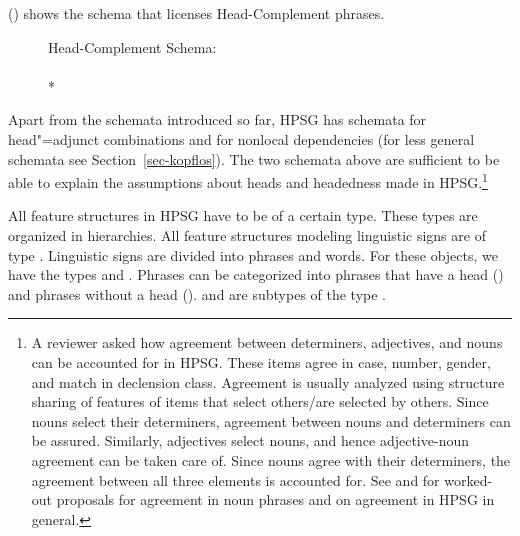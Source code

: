 \documentclass[output=paper
  ,nobabel
  ,draftmode
  ,uniformtopskip %
  ,colorlinks, citecolor=brown
]{langscibook}
\begin{document}
() shows the schema that licenses Head-Complement phrases.
\begin{figure}
\ea
\label{head-complement-phrase}
Head-Complement Schema:\\
 \impl\\*
\z
\vspace{-1.5\baselineskip}
\end{figure}
Apart from the schemata introduced so far, HPSG has schemata for head"=adjunct combinations and for
nonlocal dependencies (for less general schemata see Section~\ref{sec-kopflos}). The two schemata
above are sufficient to be able to explain the assumptions about heads and headedness made in
HPSG.\footnote{%
  A reviewer asked how agreement between determiners, adjectives, and nouns can be accounted for in
  HPSG. These items agree in case, number, gender, and match in declension class. Agreement is usually
  analyzed using structure sharing of features of items that select others/are selected by
  others. Since nouns select their determiners, agreement between nouns and determiners can be
  assured. Similarly, adjectives select nouns, and hence adjective-noun agreement can be taken
  care of. Since nouns agree with their determiners, the agreement between all three elements is
  accounted for. See  and  for
  worked-out proposals for agreement in  noun phrases and  on agreement in HPSG in general.
}

\largerpage
All feature structures in HPSG have to be of a certain type. These types are organized in hierarchies.
All feature structures modeling linguistic signs are of type . Linguistic signs are
divided into phrases and words. For these objects, we have the types  and
. Phrases can be categorized into phrases that have a head () and
phrases without a head ().  and
 are subtypes of the type .
\end{document}
